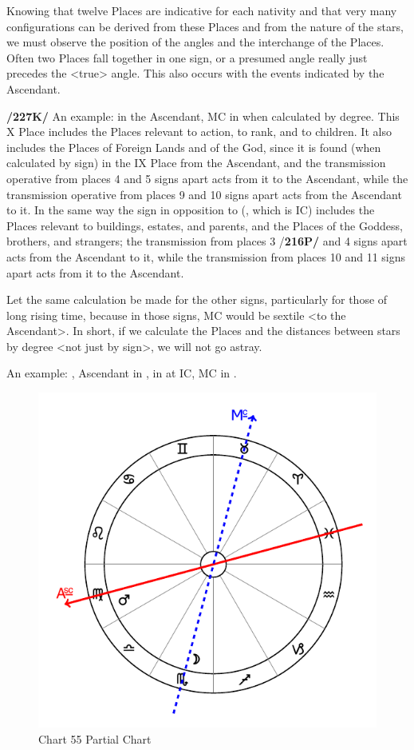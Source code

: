 Knowing that twelve Places are indicative for each nativity and that very many configurations can be derived from these Places and from
the nature of the stars, we must observe the position of the angles and the interchange of the Places. Often two Places fall together in one sign, or a presumed angle really just precedes the <true> angle. This also occurs with the events indicated by the Ascendant.

\textbf{/227K/} An example: \Gemini\xspace in the Ascendant, MC in \Aquarius\xspace when calculated by degree. This X Place includes the Places relevant to action, to rank, and to children. It also includes the Places of Foreign Lands and of the God, since it is found (when calculated by sign) in the IX Place from the Ascendant, and the transmission operative from places 4 and 5 signs apart acts from it to the Ascendant, while the transmission operative from places 9 and 10 signs apart acts from the Ascendant to it. In the same way the
sign in opposition to \Aquarius\xspace (\Leo, which is IC) includes the Places relevant to buildings, estates, and parents, and the Places of the Goddess, brothers, and strangers; the transmission from places 3 /\textbf{216P/} and 4 signs apart acts from the Ascendant to it, while the transmission from places 10 and 11 signs apart acts from it to the Ascendant. 

Let the same calculation be made for the other signs, particularly for those of long rising time, because in those signs, MC would be sextile <to the Ascendant>. In short, if we calculate the Places and the distances between stars by degree <not just by sign>, we will not go astray.

An example: \Mars, Ascendant in \Virgo, \Moon\xspace in \Scorpio\xspace at IC, MC in \Taurus. 

\begin{figure}
\centering
\vspace{-20pt}
\includegraphics[width=.68\textwidth]{charts/5_09_2}
\caption{Chart 55 Partial Chart}
\label{fig:chart55}
\end{figure}

